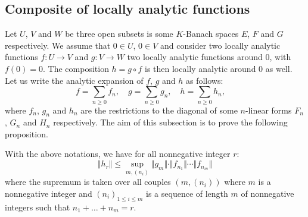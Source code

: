 \documentclass{sig-alternate}
\begin{document}
\begin{comment}
Let $x$ be the unique value such that the left (resp. right) derivative 
of $\varphi$ at $x$ is less than (resp. greater than) or equal to $s$. 
Let $\ell^-$ (resp. $\ell^+$) denote the left (resp. right) derivative 
of $\varphi_1$ at $\varphi_2(x)$ and $n^-$ (resp. $n^+$) denote the left 
(resp. right) derivative of $\varphi_2$ at $x$. On the one hand, $\ell^- 
n^- \leq s \leq \ell^+ n^+$ since $\ell^- n^-$ (resp. $\ell^+ n^+$) 
equals the left (resp. right) derivative of $\varphi$ at $x$). On the 
other hand:
$$\begin{array}{ll}
\varphi_1^\star(u) = \varphi(x) - u \varphi_2(x) & 
\text{for all } u \in [\ell^-,\, \ell^+] \\
\varphi_2^\star(u) = \varphi_2(x) - u x & 
\text{for all } u \in [n^-,\, n^+] \\
\varphi^\star(u) = \varphi(x) - u x & 
\text{for all } u \in [\ell^- n^-,\, \ell^+ n^+] \\
\end{array}$$
Therefore, the inequality \eqref{eq:inegvarphi} is an equality for all 
integer $\ell \in [\ell^-, \ell^+]$ and all sequences of integers 
$(n_i)_{1 \leq i \leq \ell}$ with $n_i \in [n^-, n^+]$ for all $i$ and 
$n_1 + \cdots + n_\ell = s$. It is then enough to prove that such a 
couple $(\ell, (n_i))$ exists but it is clear.
\end{proof}

\end{comment}

\subsection{Composite of locally analytic functions}

Let $U$, $V$ and $W$ be three open subsets is some $K$-Banach spaces
$E$, $F$ and $G$ respectively. We assume that $0 \in U$, $0 \in V$ and
consider two locally analytic functions $f : U \to V$ and $g : V \to W$ 
two locally analytic functions around $0$, with $f(0)=0.$ The composition $h = g \circ
f$ is then locally analytic around $0$ as well. Let us write the
analytic expansion of $f$, $g$ and $h$ as follows:
$$f = \sum_{n \geq 0} f_n, \quad 
g = \sum_{n \geq 0} g_n, \quad
h = \sum_{n \geq 0} h_n, \quad$$
where $f_n$, $g_n$ and $h_n$ are the restrictions to the diagonal of 
some $n$-linear forms $F_n$, $G_n$ and $H_n$ respectively. The aim of
this subsection is to prove the following proposition.

\begin{prop}
\label{prop:boundhr}
With the above notations, we have for all nonnegative integer $r$:
$$\Vert h_r \Vert \leq \sup_{m, (n_i)}
  \Vert g_m \Vert \cdot \Vert f_{n_1} \Vert \cdots \Vert f_{n_m} \Vert$$
where the supremum is taken over all couples $(m, (n_i))$ where $m$
is a nonnegative integer and $(n_i)_{1 \leq i \leq m}$ is a sequence of
length $m$ of nonnegative integers such that $n_1 + \ldots + n_m = r$.
\end{prop}
\end{document}
